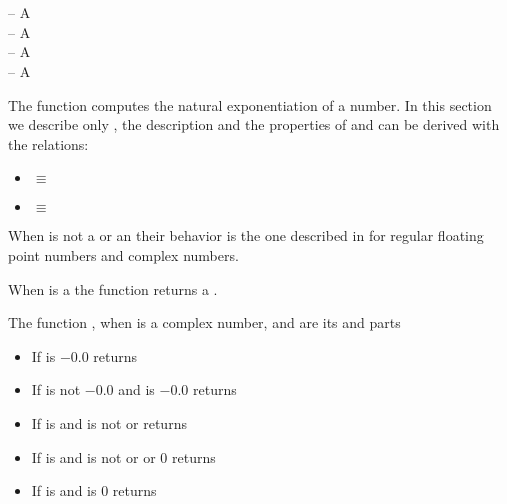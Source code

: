 \documentclass[../Exponentials-Logarithms-Trigonometry.tex]{subfiles}
\begin{document}

\DSyntax{}

  \RArrow {}\\
   \RArrow {}\\
  \RArrow {}

\DArgsNValues{}

 -- A \\
 -- A \\
 -- A \\
 -- A 

\DDescription{}

The function  computes the natural exponentiation of a number. In
this section we describe only , the description and the properties
of  and  can be derived with the relations:
\begin{itemize}
\item {}  \code{)} $\equiv$ 
  \code{)}  \code{))}
\item {} \code{)} $\equiv$  
  \code{))}
\end{itemize}


When  is not a  or an
 their behavior is the one described in
\cite{1996:ANSIHyperSpec} for regular floating point numbers and complex
numbers.

\noindent
When  is a  the function  returns a
.

\noindent
The function , when  is a complex number, 
and  are its  and  parts
\begin{itemize}
\item If  is $-0.0$ returns 
  \code{))}
\item If  is not $-0.0$ and  is
  $-0.0$ returns  
\item If  is  and
   is not  or 
  returns \code{)))}
\item If  is  and
   is not  or  or $0$
  returns \code{)))}
\item If  is  and  is $0$
  returns 
\end{itemize}
\end{document}
